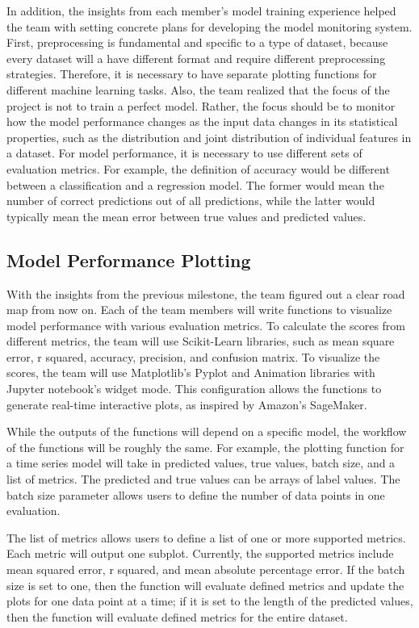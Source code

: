 \documentclass[
	letterpaper, %
	12pt, %
]{CSUniSchoolLabReport}
\begin{document}
In addition, the insights from each member’s model training experience helped the team with setting concrete plans for developing the model monitoring system. First, preprocessing is fundamental and specific to a type of dataset, because every dataset will a have different format and require different preprocessing strategies. Therefore, it is necessary to have separate plotting functions for different machine learning tasks. Also, the team realized that the focus of the project is not to train a perfect model. Rather, the focus should be to monitor how the model performance changes as the input data changes in its statistical properties, such as the distribution and joint distribution of individual features in a dataset. For model performance, it is necessary to use different sets of evaluation metrics. For example, the definition of accuracy would be different between a classification and a regression model. The former would mean the number of correct predictions out of all predictions, while the latter would typically mean the mean error between true values and predicted values. 
\subsection{Model Performance Plotting}
With the insights from the previous milestone, the team figured out a clear road map from now on. Each of the team members will write functions to visualize model performance with various evaluation metrics. To calculate the scores from different metrics, the team will use Scikit-Learn libraries, such as mean square error, r squared, accuracy, precision, and confusion matrix. To visualize the scores, the team will use Matplotlib’s Pyplot and Animation libraries with Jupyter notebook’s widget mode. This configuration allows the functions to generate real-time interactive plots, as inspired by Amazon’s SageMaker. \par

While the outputs of the functions will depend on a specific model, the workflow of the functions will be roughly the same. For example, the plotting function for a time series model will take in predicted values, true values, batch size, and a list of metrics. The predicted and true values can be arrays of label values. The batch size parameter allows users to define the number of data points in one evaluation.

The list of metrics allows users to define a list of one or more supported metrics. Each metric will output one subplot. Currently, the supported metrics include mean squared error, r squared, and mean absolute percentage error. If the batch size is set to one, then the function will evaluate defined metrics and update the plots for one data point at a time; if it is set to the length of the predicted values, then the function will evaluate defined metrics for the entire dataset. \par
\end{document}
